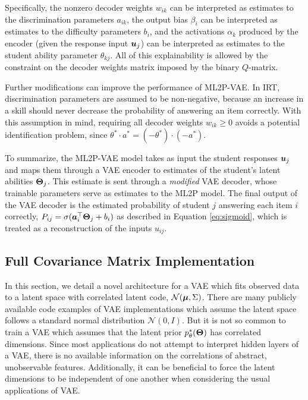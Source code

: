 Specifically, the nonzero decoder weights $w_{ik}$ can be interpreted as estimates to the discrimination parameters $a_{ik}$, the output bias $\beta_i$ can be interpreted as estimates to the difficulty parameters $b_i$, and the activations $\alpha_k$ produced by the encoder (given the response input $\boldsymbol{u}_j$) can be interpreted as estimates to the student ability parameter $\theta_{kj}$. All of this explainability is allowed by the constraint on the decoder weights matrix imposed by the binary $Q$-matrix.

Further modifications can improve the performance of ML2P-VAE. In IRT, discrimination parameters are assumed to be non-negative, because an increase in a skill should never decrease the probability of answering an item correctly. With this assumption in mind, requiring all decoder weights $w_{ik} \geq 0$ avoids a potential identification problem, since $\theta^* \cdot a^* = (-\theta^*)\cdot(-a^*)$.

To summarize, the ML2P-VAE model takes as input the student responses $\boldsymbol{u}_j$ and maps them through a VAE encoder to estimates of the student's latent abilities $\boldsymbol{\Theta}_j$. This estimate is sent through a \textit{modified} VAE decoder, whose trainable parameters serve as estimates to the ML2P model. The final output of the VAE decoder is the estimated probability of student $j$ answering each item $i$ correctly, $P_{ij} = \sigma(\boldsymbol{a}_i^\top \boldsymbol{\Theta}_j + b_i)$ as described in Equation \ref{eq:sigmoid}, which is treated as a reconstruction of the inputs $u_{ij}$.


\subsection{Full Covariance Matrix Implementation}\label{sec:cov}
In this section, we detail a novel architecture for a VAE which fits observed data to a latent space with correlated latent code, $\mathcal{N}(\boldsymbol{\mu}, \Sigma)$. There are many publicly available code examples of VAE implementations which assume the latent space follows a standard normal distribution $\mathcal{N}(0,I)$. But it is not so common to train a VAE which assumes that the latent prior $p_\theta^*(\boldsymbol{\Theta})$ has correlated dimensions. Since most applications do not attempt to interpret hidden layers of a VAE, there is no available information on the correlations of abstract, unobservable features. Additionally, it can be beneficial to force the latent dimensions to be independent of one another when considering the usual applications of VAE.

